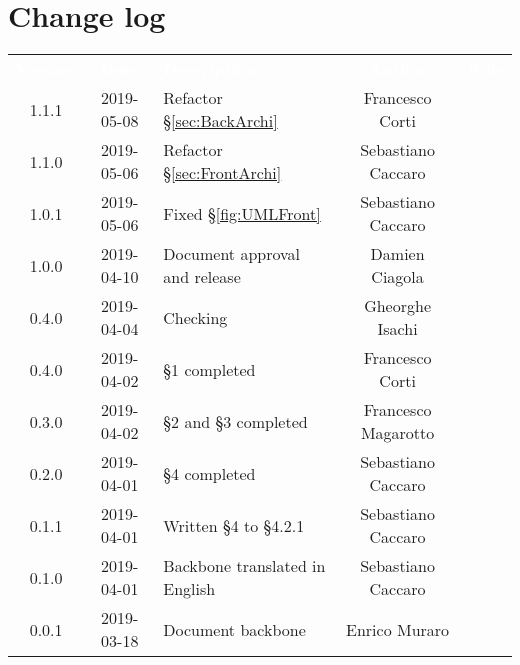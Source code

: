 \section*{Change log}
{
	\renewcommand{\arraystretch}{1.5}
	\centering
	\begin{longtable}{ c c C{6cm} c c }
		\textcolor{white}{\textbf{Version}} & \textcolor{white}{\textbf{Date}} & \textcolor{white}{\textbf{Description}} & \textcolor{white}{\textbf{Author}} & \textcolor{white}{\textbf{Role}}\\
		1.1.1 & 2019-05-08 & Refactor §\ref{sec:BackArchi}  & Francesco Corti & \reda{}\\
		1.1.0 & 2019-05-06 & Refactor §\ref{sec:FrontArchi} & Sebastiano Caccaro & \reda{}\\
		1.0.1 & 2019-05-06 & Fixed §\ref{fig:UMLFront} & Sebastiano Caccaro & \reda{}\\
		1.0.0 & 2019-04-10 & Document approval and release & Damien Ciagola & \RdP{}\\
		0.4.0 & 2019-04-04 & Checking & Gheorghe Isachi & \ver{}\\
		0.4.0 & 2019-04-02 & §1 completed  & Francesco Corti & \reda{}\\		
		0.3.0 & 2019-04-02 & §2 and §3 completed  & Francesco Magarotto & \reda{}\\				
		0.2.0 & 2019-04-01 & §4 completed  & Sebastiano Caccaro & \reda{}\\
		0.1.1 & 2019-04-01 & Written §4 to §4.2.1  & Sebastiano Caccaro & \reda{}\\
		0.1.0 & 2019-04-01 & Backbone translated in English & Sebastiano Caccaro & \reda{}\\
		0.0.1 & 2019-03-18 & Document backbone & Enrico Muraro & \reda{}\\
		
	\end{longtable}

}

